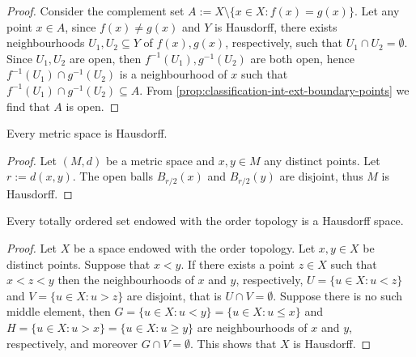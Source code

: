 \begin{proof}
  Consider the complement set \(A := X \setminus \{x \in X : f(x) = g(x)\}\).
  Let any point \(x \in A\), since \(f(x) \neq g(x)\) and \(Y\) is Hausdorff,
  there exists neighbourhoods \(U_1, U_2 \subseteq Y\) of \(f(x), g(x)\),
  respectively, such that \(U_1 \cap U_2 = \emptyset\). Since \(U_1, U_2\) are
  open, then \(f^{-1}(U_1), g^{-1}(U_2)\) are both open, hence \(f^{-1}(U_1)
  \cap g^{-1}(U_2)\) is a neighbourhood of \(x\) such that \(f^{-1}(U_1) \cap
  g^{-1}(U_2) \subseteq A\). From \cref{prop:classification-int-ext-boundary-points} we
  find that \(A\) is open.
\end{proof}

\begin{proposition}\label{prop: metric space T2}
  Every metric space is Hausdorff.
\end{proposition}

\begin{proof}
  Let \((M, d)\) be a metric space and \(x, y \in M\) any distinct points. Let
  \(r := d(x, y)\). The open balls \(B_{r/2}(x)\) and \(B_{r/2}(y)\) are
  disjoint, thus \(M\) is Hausdorff.
\end{proof}

\begin{proposition}\label{prop: order top implies T2}
  Every totally ordered set endowed with the order topology is a Hausdorff
  space.
\end{proposition}

\begin{proof}
  Let \(X\) be a space endowed with the order topology. Let \(x, y \in X\) be
  distinct points. Suppose that \(x < y\). If there exists a point \(z \in X\)
  such that  \(x < z < y\) then the neighbourhoods of \(x\) and \(y\),
  respectively, \(U = \{u \in X : u < z\}\) and \(V = \{u \in X : u > z\}\) are
  disjoint, that is \(U \cap V = \emptyset\). Suppose there is no such middle
  element, then \(G = \{u \in X : u < y\} = \{u \in X : u \leq x\}\) and \(H =
  \{u \in X : u > x\} = \{u \in X : u \geq y\}\) are neighbourhoods of \(x\) and
  \(y\), respectively, and moreover \(G \cap V = \emptyset\). This shows that
  \(X\) is Hausdorff.
\end{proof}
